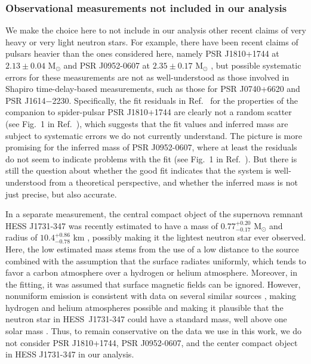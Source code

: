\documentclass[aps,prd,nofootinbib,tightenlines,notitlepage,floatfix,superscriptaddress,showkeys,twocolumn]{revtex4-1}
\newcommand{\Msol}{M$_\odot$ }
\begin{document}
\subsubsection{Observational measurements not included in our analysis}\label{subsec:not_inlcuded}

We make the choice here to not include in our analysis other recent claims of very heavy or very light neutron stars. For example, there have been recent claims of pulsars heavier than the ones considered here, namely PSR J1810+1744 at $2.13\pm0.04$ \Msol \cite{Romani:2021xmb} and PSR J0952-0607 at $2.35\pm 0.17$ \Msol \cite{Romani:2022jhd}, but possible systematic errors for these measurements are not as well-understood as those involved in Shapiro time-delay-based measurements, such as those for PSR J0740+6620 and PSR J1614$-$2230. Specifically, the fit residuals in Ref.~\cite{Romani:2021xmb} for the properties of the companion to spider-pulsar PSR J1810+1744 are clearly not a random scatter (see Fig.~1 in Ref.~\cite{Romani:2021xmb}), which suggests that the fit values and inferred mass are subject to systematic errors we do not currently understand. The picture is more promising for the inferred mass of PSR J0952-0607, where at least the residuals do not seem to indicate problems with the fit (see Fig.~1 in Ref.~\cite{Romani:2022jhd}). But there is still the question about whether the good fit indicates that the system is well-understood from a theoretical perspective, and whether the inferred mass is not just precise, but also accurate. 

In a separate measurement, the central compact object of the supernova remnant HESS J1731-347 was recently estimated to have a mass of $0.77^{+0.20}_{-0.17}$ \Msol and radius of $10.4^{+0.86}_{-0.78}$ km \cite{doroshenko2022strangely}, possibly making it the lightest neutron star ever observed. Here, the low estimated mass stems from the use of a low distance to the source combined with the assumption that the surface radiates uniformly, which tends to favor a carbon atmosphere over a hydrogen or helium atmosphere. Moreover, in the fitting, it was assumed that surface magnetic fields can be ignored.  However, nonuniform emission is consistent with data on several similar sources \cite{Alford:2023waw}, making hydrogen and helium atmospheres possible and making it plausible that the neutron star in HESS~J1731-347 could have a standard mass, well above one solar mass \cite{MUSES:2023hyz}. Thus, to remain conservative on the data we use in this work, we do not consider PSR J1810+1744, PSR J0952-0607, and the center compact object in HESS J1731-347 in our analysis.
\end{document}

